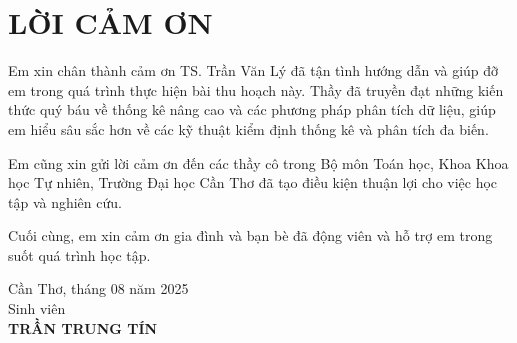 \chapter*{LỜI CẢM ƠN}

Em xin chân thành cảm ơn TS. Trần Văn Lý đã tận tình hướng dẫn và giúp đỡ em trong quá trình thực hiện bài thu hoạch này. Thầy đã truyền đạt những kiến thức quý báu về thống kê nâng cao và các phương pháp phân tích dữ liệu, giúp em hiểu sâu sắc hơn về các kỹ thuật kiểm định thống kê và phân tích đa biến.

Em cũng xin gửi lời cảm ơn đến các thầy cô trong Bộ môn Toán học, Khoa Khoa học Tự nhiên, Trường Đại học Cần Thơ đã tạo điều kiện thuận lợi cho việc học tập và nghiên cứu.

Cuối cùng, em xin cảm ơn gia đình và bạn bè đã động viên và hỗ trợ em trong suốt quá trình học tập.

\vspace{2cm}
\hfill\begin{minipage}{6cm}
\centering
Cần Thơ, tháng 08 năm 2025\\
Sinh viên\\[2ex]
\textbf{TRẦN TRUNG TÍN}
\end{minipage}
